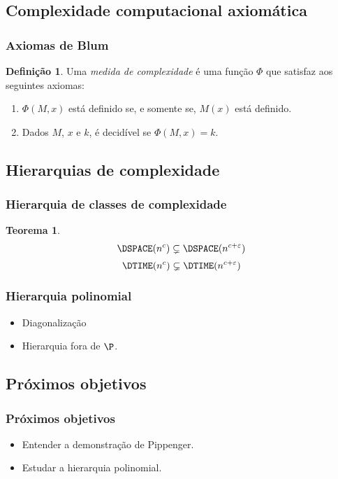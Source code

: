 \documentclass[utf8,notheorems]{beamer}
\newtheorem*{theorem}{Teorema}
\theoremstyle{definition}
\newtheorem*{definition}{Definição}
\begin{document}
\subsection{Complexidade computacional axiomática}
\begin{frame}
    \frametitle{Axiomas de Blum}
    \begin{definition}
        Uma \emph{medida de complexidade}
        é uma função $\Phi$ que satisfaz aos seguintes axiomas:
        \begin{enumerate}
            \item
                $\Phi(M, x)$ está definido
                se, e somente se,
                $M(x)$ está definido.
            \item
                Dados $M$, $x$ e $k$,
                é decidível se $\Phi(M, x) = k$.
        \end{enumerate}
    \end{definition}
\end{frame}

\subsection{Hierarquias de complexidade}
\begin{frame}
    \frametitle{Hierarquia de classes de complexidade}

    \begin{theorem}
        \begin{displaymath}
            \DSPACE(n^c) \subsetneq \DSPACE(n^{c+\varepsilon})
        \end{displaymath}
        \begin{displaymath}
            \DTIME(n^c) \subsetneq \DTIME(n^{c+\varepsilon})
        \end{displaymath}
    \end{theorem}
\end{frame}

\begin{frame}
    \frametitle{Hierarquia polinomial}

    \begin{itemize}
        \item Diagonalização
        \item Hierarquia fora de $\P$.
    \end{itemize}
\end{frame}

\subsection{Próximos objetivos}
\begin{frame}
    \frametitle{Próximos objetivos}

    \begin{itemize}
        \item Entender a demonstração de Pippenger.
        \item Estudar a hierarquia polinomial.
    \end{itemize}
\end{frame}
\end{document}
